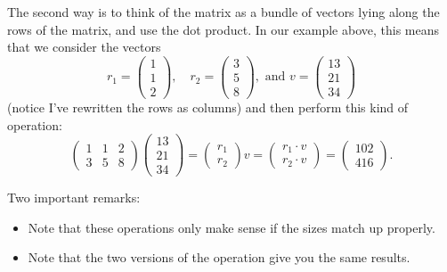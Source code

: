 \documentclass[10pt,]{book}
\theoremstyle{plain}
\numberwithin{equation}{section}
\begin{document}
          The second way is to think of the matrix as a bundle of vectors lying
          along the rows of the matrix, and use the dot product. In our example
          above, this means that we consider the vectors\[
            r_1 = \begin{pmatrix} 1 \\ 1 \\ 2 \end{pmatrix}, \quad
            r_2 = \begin{pmatrix} 3 \\ 5 \\ 8 \end{pmatrix}, \text{ and }
            v = \begin{pmatrix} 13 \\ 21 \\ 34 \end{pmatrix}
          \]
          (notice I've rewritten the rows as columns) and then perform this
          kind of operation:\[
            \begin{pmatrix} 1 & 1 & 2 \\ 3 & 5 & 8 \end{pmatrix}
            \begin{pmatrix} 13 \\ 21 \\ 34 \end{pmatrix} = \begin{pmatrix} r_1
            \\ r_2 \end{pmatrix} v =  \begin{pmatrix} r_1 \cdot v \\ r_2 \cdot
            v \end{pmatrix} =
            \begin{pmatrix} 102 \\ 416 \end{pmatrix} .
          \]
\par

      Two important remarks:
      \begin{itemize}
\item{}
          Note that these operations only make sense if the sizes match up properly.
        \item{}
          Note that the two versions of the operation give you the same results.
        \end{itemize}

\typeout{************************************************}
\typeout{************************************************}
\end{document}
